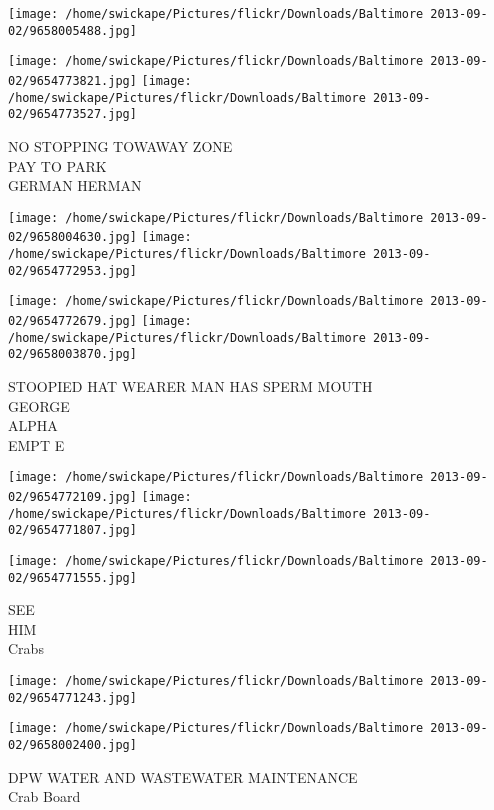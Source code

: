 \documentclass[10pt,letterpaper]{article}
\begin{document}
\texttt{[image: /home/swickape/Pictures/flickr/Downloads/Baltimore 2013-09-02/9658005488.jpg]}

\vspace{0.25in}
\texttt{[image: /home/swickape/Pictures/flickr/Downloads/Baltimore 2013-09-02/9654773821.jpg]}
\texttt{[image: /home/swickape/Pictures/flickr/Downloads/Baltimore 2013-09-02/9654773527.jpg]}

NO STOPPING TOWAWAY ZONE\\
PAY TO PARK\\
GERMAN HERMAN\\
\pagebreak

\texttt{[image: /home/swickape/Pictures/flickr/Downloads/Baltimore 2013-09-02/9658004630.jpg]}
\texttt{[image: /home/swickape/Pictures/flickr/Downloads/Baltimore 2013-09-02/9654772953.jpg]}

\texttt{[image: /home/swickape/Pictures/flickr/Downloads/Baltimore 2013-09-02/9654772679.jpg]}
\texttt{[image: /home/swickape/Pictures/flickr/Downloads/Baltimore 2013-09-02/9658003870.jpg]}

STOOPIED HAT WEARER MAN HAS SPERM MOUTH\\
GEORGE\\
ALPHA\\
EMPT E\\
\pagebreak

\texttt{[image: /home/swickape/Pictures/flickr/Downloads/Baltimore 2013-09-02/9654772109.jpg]}
\texttt{[image: /home/swickape/Pictures/flickr/Downloads/Baltimore 2013-09-02/9654771807.jpg]}

\texttt{[image: /home/swickape/Pictures/flickr/Downloads/Baltimore 2013-09-02/9654771555.jpg]}

SEE\\
HIM\\
Crabs\\
\pagebreak

\texttt{[image: /home/swickape/Pictures/flickr/Downloads/Baltimore 2013-09-02/9654771243.jpg]}

\vspace{0.25in}
\texttt{[image: /home/swickape/Pictures/flickr/Downloads/Baltimore 2013-09-02/9658002400.jpg]}

DPW WATER AND WASTEWATER MAINTENANCE\\
Crab Board\\
\pagebreak
\end{document}
